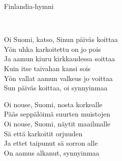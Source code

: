 \begin{song}{Finlandia-hymni}

	\\

	Oi Suomi, katso, Sinun päiväs koittaa\\
	Yön uhka karkoitettu on jo pois\\
	Ja aamun kiuru kirkkaudessa soittaa\\
	Kuin itse taivahan kansi sois\\
	Yön vallat aamun valkeus jo voittaa\\
	Sun päiväs koittaa, oi synnyinmaa

	Oi nouse, Suomi, nosta korkealle\\
	Pääs seppälöimä suurten muistojen\\
	Oi nouse, Suomi, näytit maailmalle\\
	Sä että karkoitit orjuuden\\
	Ja ettet taipunut sä sorron alle\\
	On aamus alkanut, synnyinmaa
	
	
	
\end{song}
